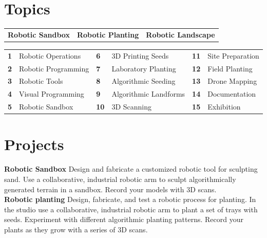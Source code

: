 \documentclass[11pt,article,oneside]{memoir}
\begin{document}
\section{Topics}
%
\begin{table}[H]
\begin{tabular}{l @{\hskip 1.8cm} l @{\hskip 2.3cm} l}
\textbf{Robotic Sandbox} & \textbf{Robotic Planting} & \textbf{Robotic Landscape}\\
\end{tabular}
\end{table}
%
\vspace*{-1em}
%
\begin{table}[H]
\begin{tabular}{l l l l l l}
\small
\textbf{1} & Robotic Operations  & \textbf{6} & 3D Printing Seeds & \textbf{11} & Site Preparation\\
\textbf{2} & Robotic Programming & \textbf{7} & Laboratory Planting & \textbf{12} & Field Planting\\
\textbf{3} &  Robotic Tools & \textbf{8} & Algorithmic Seeding & \textbf{13} & Drone Mapping\\
\textbf{4} & Visual Programming & \textbf{9} & Algorithmic Landforms & \textbf{14} & Documentation\\
\textbf{5} & Robotic Sandbox & \textbf{10} & 3D Scanning & \textbf{15} & Exhibition\\
\end{tabular}
\end{table}

\clearpage

\section{Projects}

\noindent \textbf{Robotic Sandbox}
Design and fabricate a customized robotic tool
for sculpting sand. 
Use a collaborative, industrial robotic arm
to sculpt algorithmically generated terrain
in a sandbox. 
Record your models with 3D scans.
\\

\noindent \textbf{Robotic planting}
Design, fabricate, and test a robotic process for planting.
In the studio use a collaborative, industrial robotic arm
to plant a set of trays with seeds. 
Experiment with different algorithmic planting patterns. 
Record your plants as they grow with a series of 3D scans.
\\
\end{document}

